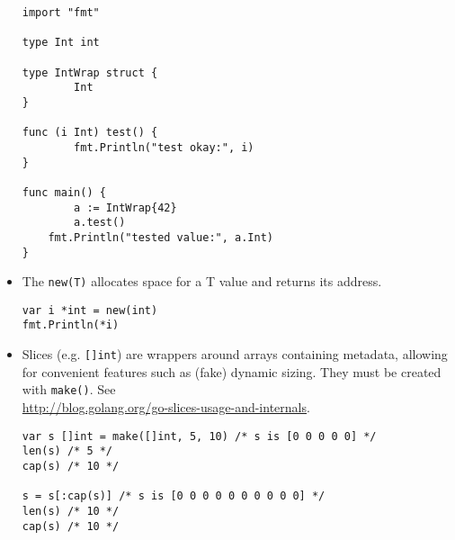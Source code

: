 \documentclass[12pt]{article}
\begin{document}
\begin{itemize}
\begin{verbatim}
import "fmt"

type Int int

type IntWrap struct {
        Int
}

func (i Int) test() {
        fmt.Println("test okay:", i)
}

func main() {
        a := IntWrap{42} 
        a.test()
    fmt.Println("tested value:", a.Int)
}
        \end{verbatim}
          
    \item The \texttt{new(T)} allocates space for a T value and
          returns its address.
          \begin{verbatim}
var i *int = new(int)
fmt.Println(*i)
          \end{verbatim}

    \item Slices (e.g. \texttt{[]int}) are wrappers around arrays
          containing metadata, allowing for convenient features
          such as (fake) dynamic sizing. They must be created with
          \texttt{make()}. See \\
          \url{http://blog.golang.org/go-slices-usage-and-internals}.

          \begin{verbatim}
var s []int = make([]int, 5, 10) /* s is [0 0 0 0 0] */
len(s) /* 5 */
cap(s) /* 10 */

s = s[:cap(s)] /* s is [0 0 0 0 0 0 0 0 0 0] */
len(s) /* 10 */
cap(s) /* 10 */


\end{verbatim}
\end{itemize}
\end{document}

